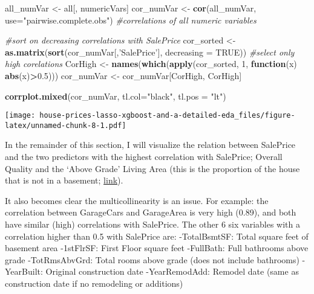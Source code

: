 \documentclass[]{article}
\newenvironment{Shaded}{\begin{snugshade}}{\end{snugshade}}
\newcommand{\KeywordTok}[1]{\textcolor[rgb]{0.13,0.29,0.53}{\textbf{#1}}}
\newcommand{\DataTypeTok}[1]{\textcolor[rgb]{0.13,0.29,0.53}{#1}}
\newcommand{\DecValTok}[1]{\textcolor[rgb]{0.00,0.00,0.81}{#1}}
\newcommand{\FloatTok}[1]{\textcolor[rgb]{0.00,0.00,0.81}{#1}}
\newcommand{\StringTok}[1]{\textcolor[rgb]{0.31,0.60,0.02}{#1}}
\newcommand{\CommentTok}[1]{\textcolor[rgb]{0.56,0.35,0.01}{\textit{#1}}}
\newcommand{\OtherTok}[1]{\textcolor[rgb]{0.56,0.35,0.01}{#1}}
\newcommand{\ControlFlowTok}[1]{\textcolor[rgb]{0.13,0.29,0.53}{\textbf{#1}}}
\newcommand{\OperatorTok}[1]{\textcolor[rgb]{0.81,0.36,0.00}{\textbf{#1}}}
\newcommand{\NormalTok}[1]{#1}
\begin{document}
\begin{Shaded}
\begin{Highlighting}[]
\NormalTok{all_numVar <-}\StringTok{ }\NormalTok{all[, numericVars]}
\NormalTok{cor_numVar <-}\StringTok{ }\KeywordTok{cor}\NormalTok{(all_numVar, }\DataTypeTok{use=}\StringTok{"pairwise.complete.obs"}\NormalTok{) }\CommentTok{#correlations of all numeric variables}

\CommentTok{#sort on decreasing correlations with SalePrice}
\NormalTok{cor_sorted <-}\StringTok{ }\KeywordTok{as.matrix}\NormalTok{(}\KeywordTok{sort}\NormalTok{(cor_numVar[,}\StringTok{'SalePrice'}\NormalTok{], }\DataTypeTok{decreasing =} \OtherTok{TRUE}\NormalTok{))}
 \CommentTok{#select only high corelations}
\NormalTok{CorHigh <-}\StringTok{ }\KeywordTok{names}\NormalTok{(}\KeywordTok{which}\NormalTok{(}\KeywordTok{apply}\NormalTok{(cor_sorted, }\DecValTok{1}\NormalTok{, }\ControlFlowTok{function}\NormalTok{(x) }\KeywordTok{abs}\NormalTok{(x)}\OperatorTok{>}\FloatTok{0.5}\NormalTok{)))}
\NormalTok{cor_numVar <-}\StringTok{ }\NormalTok{cor_numVar[CorHigh, CorHigh]}

\KeywordTok{corrplot.mixed}\NormalTok{(cor_numVar, }\DataTypeTok{tl.col=}\StringTok{"black"}\NormalTok{, }\DataTypeTok{tl.pos =} \StringTok{"lt"}\NormalTok{)}
\end{Highlighting}
\end{Shaded}

\texttt{[image: house-prices-lasso-xgboost-and-a-detailed-eda\_files/figure-latex/unnamed-chunk-8-1.pdf]}

In the remainder of this section, I will visualize the relation between
SalePrice and the two predictors with the highest correlation with
SalePrice; Overall Quality and the `Above Grade' Living Area (this is
the proportion of the house that is not in a basement;
\href{http://www.gimme-shelter.com/above-grade-50066/}{link}).

It also becomes clear the multicollinearity is an issue. For example:
the correlation between GarageCars and GarageArea is very high (0.89),
and both have similar (high) correlations with SalePrice. The other 6
six variables with a correlation higher than 0.5 with SalePrice are:
-TotalBsmtSF: Total square feet of basement area -1stFlrSF: First Floor
square feet -FullBath: Full bathrooms above grade -TotRmsAbvGrd: Total
rooms above grade (does not include bathrooms) -YearBuilt: Original
construction date -YearRemodAdd: Remodel date (same as construction date
if no remodeling or additions)
\end{document}
